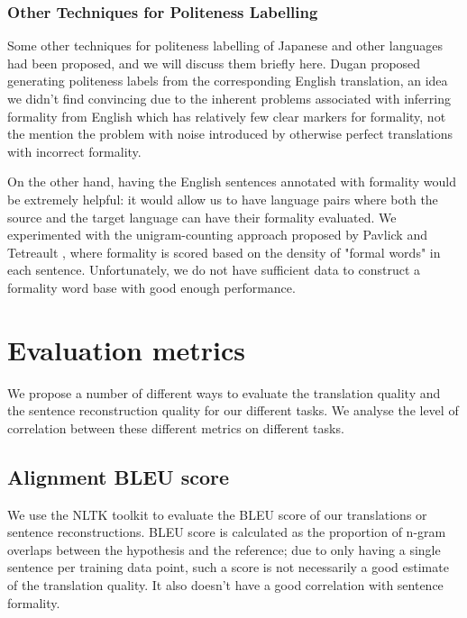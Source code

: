 \documentclass[11pt]{article}
\begin{document}
\subsubsection{Other Techniques for Politeness Labelling}

Some other techniques for politeness labelling of Japanese and other languages had been proposed, and we will discuss them briefly here. Dugan \cite{Dugan:20} proposed generating politeness labels from the corresponding English translation, an idea we didn't find convincing due to the inherent problems associated with inferring formality from English which has relatively few clear markers for formality, not the mention the problem with noise introduced by otherwise perfect translations with incorrect formality.

On the other hand, having the English sentences annotated with formality would be extremely helpful: it would allow us to have language pairs where both the source and the target language can have their formality evaluated. We experimented with the unigram-counting approach proposed by Pavlick and Tetreault \cite{pavlick-tetreault-2016-empirical}, where formality is scored based on the density of "formal words" in each sentence. Unfortunately, we do not have sufficient data to construct a formality word base with good enough performance.

\section{Evaluation metrics}

We propose a number of different ways to evaluate the translation quality and the sentence reconstruction quality for our different tasks. We analyse the level of correlation between these different metrics on different tasks.

\subsection{Alignment BLEU score}

We use the NLTK toolkit \cite{NLTK} to evaluate the BLEU score \cite{10.3115/1073083.1073135} of our translations or sentence reconstructions. BLEU score is calculated as the proportion of n-gram overlaps between the hypothesis and the reference; due to only having a single sentence per training data point, such a score is not necessarily a good estimate of the translation quality. It also doesn't have a good correlation with sentence formality.
\end{document}
